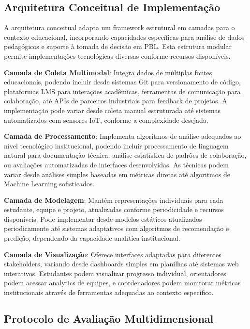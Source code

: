 \documentclass[english, spanish, brazilian]{RBIEarticle} %
\begin{document}
\subsection{Arquitetura Conceitual de Implementação}

\indent

A arquitetura conceitual adapta um framework estrutural em camadas para o
contexto educacional, incorporando capacidades específicas para análise de
dados pedagógicos e suporte à tomada de decisão em PBL. Esta estrutura modular
permite implementações tecnológicas diversas conforme recursos disponíveis.

\textbf{Camada de Coleta Multimodal}: Integra dados de múltiplas fontes educacionais, podendo incluir desde sistemas Git para versionamento de código, plataformas LMS para interações acadêmicas, ferramentas de comunicação para colaboração, até APIs de parceiros industriais para feedback de projetos. A implementação pode variar desde coleta manual estruturada até sistemas automatizados com sensores IoT, conforme a complexidade desejada.

\textbf{Camada de Processamento}: Implementa algoritmos de análise adequados ao nível tecnológico institucional, podendo incluir processamento de linguagem natural para documentação técnica, análise estatística de padrões de colaboração, ou avaliações automatizadas de interfaces desenvolvidas. As técnicas podem variar desde análises simples baseadas em métricas diretas até algoritmos de Machine Learning sofisticados.

\textbf{Camada de Modelagem}: Mantém representações individuais para cada estudante, equipe e projeto, atualizadas conforme periodicidade e recursos disponíveis. Pode implementar desde modelos estáticos atualizados periodicamente até sistemas adaptativos com algoritmos de recomendação e predição, dependendo da capacidade analítica institucional.

\textbf{Camada de Visualização}: Oferece interfaces adaptadas para diferentes stakeholders, variando desde dashboards simples em planilhas até sistemas web interativos. Estudantes podem visualizar progresso individual, orientadores podem acessar analytics de equipes, e coordenadores podem monitorar métricas institucionais através de ferramentas adequadas ao contexto específico.

\subsection{Protocolo de Avaliação Multidimensional}
\end{document}
